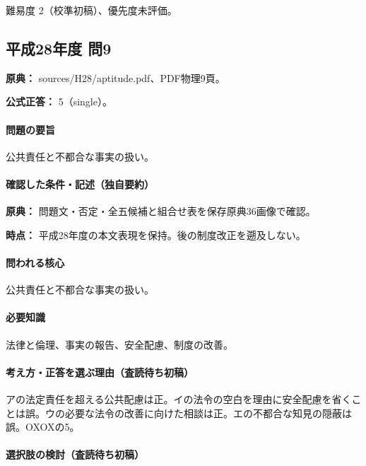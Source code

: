 \par 難易度 2（校準初稿）、優先度未評価。

\subsection{平成28年度 問9}
\label{q:h28-reg-apt-09}

\noindent\textbf{原典：} sources/H28/aptitude.pdf、PDF物理9頁。

\textbf{公式正答：} 5（single）。

\paragraph{問題の要旨} 公共責任と不都合な事実の扱い。

\paragraph{確認した条件・記述（独自要約）}\mbox{}\par

\noindent\textbf{原典：} 問題文・否定・全五候補と組合せ表を保存原典36画像で確認。\par

\noindent\textbf{時点：} 平成28年度の本文表現を保持。後の制度改正を遡及しない。\par

\paragraph{問われる核心} 公共責任と不都合な事実の扱い。

\paragraph{必要知識} 法律と倫理、事実の報告、安全配慮、制度の改善。

\paragraph{考え方・正答を選ぶ理由（査読待ち初稿）} アの法定責任を超える公共配慮は正。イの法令の空白を理由に安全配慮を省くことは誤。ウの必要な法令の改善に向けた相談は正。エの不都合な知見の隠蔽は誤。OXOXの5。

\paragraph{選択肢の検討（査読待ち初稿）}\mbox{}\par

